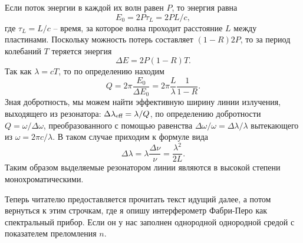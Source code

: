Если поток энергии в каждой их волн равен $P$, то энергия равна 
\begin{equation*}
    E_0 = 2 P \tau_L = 2 P L/c,
\end{equation*}
где $\tau_L = L/c$ -- время, за которое волна проходит расстояние $L$ между пластинами. Поскольку можность потерь составляет $(1-R) 2 P$, то за период колебаний $T$ теряется энергия 
\begin{equation*}
    \Delta E = 2 P (1-R) T.
\end{equation*}
Так как $\lambda = c T$, то по определению находим
\begin{equation*}
    Q = 2 \pi \frac{E_0}{\Delta E_0} = 2 \pi \frac{L}{\lambda} \frac{1}{1-R}.
\end{equation*}
Зная добротность, мы можем найти эффективную ширину линии излучения, выходящего из резонатора:
$\Delta \lambda_{\textnormal{eff}} = \lambda/Q$, по определению добротности $Q = \omega / \Delta \omega$, преобразованного с помощью равенства $\Delta \omega/\omega = \Delta \lambda/\lambda$ вытекающего из $\omega = 2 \pi c / \lambda$. В таком случае приходим к формуле вида
\begin{equation*}
    \Delta \lambda = \lambda \frac{\Delta \nu}{\nu} = \frac{\lambda^2}{2L}.
\end{equation*}
Таким образом выделяемые резонатором линии являются в высокой степени монохроматическими. 

Теперь читателю предоставляется прочитать текст идущий далее, а потом вернуться к этим строчкам, где я опишу интерферометр Фабри-Перо как спектральный прибор.
Если он у нас заполнен однородной однородной средой с показателем преломления $n$. 

